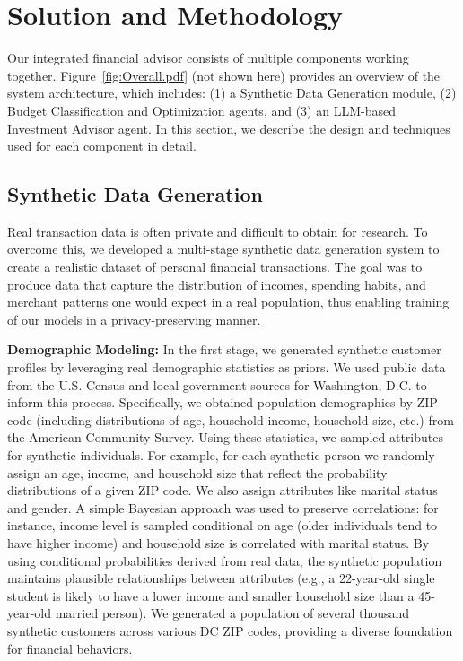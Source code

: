 \documentclass{scrartcl}
\begin{document}
\section{Solution and Methodology}
Our integrated financial advisor consists of multiple components working together. Figure~\ref{fig:Overall.pdf} (not shown here) provides an overview of the system architecture, which includes: (1) a Synthetic Data Generation module, (2) Budget Classification and Optimization agents, and (3) an LLM-based Investment Advisor agent. In this section, we describe the design and techniques used for each component in detail.

\subsection{Synthetic Data Generation}
Real transaction data is often private and difficult to obtain for research. To overcome this, we developed a multi-stage synthetic data generation system to create a realistic dataset of personal financial transactions. The goal was to produce data that capture the distribution of incomes, spending habits, and merchant patterns one would expect in a real population, thus enabling training of our models in a privacy-preserving manner.

\textbf{Demographic Modeling:} In the first stage, we generated synthetic customer profiles by leveraging real demographic statistics as priors. We used public data from the U.S. Census and local government sources for Washington, D.C. to inform this process. Specifically, we obtained population demographics by ZIP code (including distributions of age, household income, household size, etc.) from the American Community Survey. Using these statistics, we sampled attributes for synthetic individuals. For example, for each synthetic person we randomly assign an age, income, and household size that reflect the probability distributions of a given ZIP code. We also assign attributes like marital status and gender. A simple Bayesian approach was used to preserve correlations: for instance, income level is sampled conditional on age (older individuals tend to have higher income) and household size is correlated with marital status. By using conditional probabilities derived from real data, the synthetic population maintains plausible relationships between attributes (e.g., a 22-year-old single student is likely to have a lower income and smaller household size than a 45-year-old married person). We generated a population of several thousand synthetic customers across various DC ZIP codes, providing a diverse foundation for financial behaviors.
\end{document}
